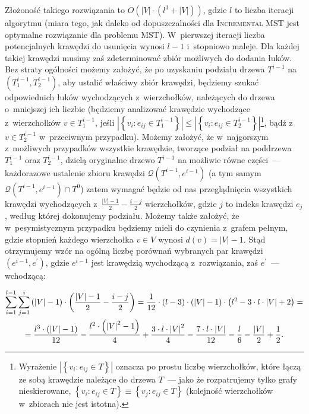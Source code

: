 Złożoność takiego rozwiązania to $O \left( \left| V \right| \cdot \left(l^{3} + \left| V \right| \right) \right)$, gdzie $l$ to liczba iteracji algorytmu (miara tego, jak daleko od dopuszczalności dla \textsc{Incremental MST} jest optymalne rozwiązanie dla problemu \textsc{MST}).
W~pierwszej iteracji liczba potencjalnych krawędzi do usunięcia wynosi $l - 1$ i~stopniowo maleje.
Dla każdej takiej krawędzi musimy zaś zdeterminować zbiór możliwych do dodania łuków.
Bez straty ogólności możemy założyć, że po uzyskaniu podziału drzewa $T^{i-1}$ na $\left( T^{i-1}_{1}, T^{i-1}_{2} \right)$, aby ustalić właściwy zbiór krawędzi, będziemy szukać odpowiednich łuków wychodzących z~wierzchołków, należących do drzewa o~mniejszej ich liczbie (będziemy analizować krawędzie wychodzące z~wierzchołków $v \in T^{i-1}_{1}$, jeśli $\left| \left\{ v_{i} : e_{ij} \in T^{i-1}_{1} \right\} \right| \leqslant \left| \left\{ v_{i} : e_{ij} \in T^{i-1}_{2} \right\} \right|$\footnote{
	Wyrażenie $\left| \left\{ v_{i} : e_{ij} \in T \right\} \right|$ oznacza po prostu liczbę wierzchołków, które łączą ze sobą krawędzie należące do drzewa $T$~--- jako że rozpatrujemy tylko grafy nieskierowane, $\left\{ v_{i} : e_{ij} \in T \right\} \equiv \left\{ v_{j} : e_{ij} \in T \right\}$ (kolejność wierzchołków w~zbiorach nie jest istotna).
}, bądź z~$v \in T^{i-1}_{2}$ w~przeciwnym przypadku).
Możemy założyć, że w~najgorszym z~możliwych przypadków wszystkie krawędzie, tworzące podział na poddrzewa $T^{i-1}_{1}$ oraz $T^{i-1}_{2}$, dzielą oryginalne drzewo $T^{i-1}$ na możliwie równe części~--- każdorazowe ustalenie zbioru krawędzi $\mathcal{Q} \left( T^{i-1}, e^{i-1} \right)$ (a tym samym $\mathcal{Q} \left( T^{i-1}, e^{i-1} \right) \cap T^{0}$) zatem wymagać będzie od nas przeglądnięcia wszystkich krawędzi wychodzących z~$\frac{\left| V \right| - 1}{2} - \frac{i - j}{2}$ wierzchołków, gdzie $j$ to indeks krawędzi $e_{j}$, według której dokonujemy podziału.
Możemy także założyć, że w~pesymistycznym przypadku będziemy mieli do czynienia z~grafem pełnym, gdzie stopnień każdego wierzchołka $v \in V$ wynosi $d \left( v \right) = \left| V \right| - 1$.
Stąd otrzymujemy wzór na ogólną liczbę porównań wybranych par krawędzi $\left( e^{i-1}, e^{\prime} \right)$, gdzie $e^{i-1}$ jest krawędzią wychodzącą z~rozwiązania, zaś $e^{\prime}$~--- wchodzącą:

\begin{gather*}
	\sum_{\mathclap{i=1}}^{\mathclap{l-1}} \sum_{\mathclap{j=1}}^{\mathclap{i}} \left( \left| V \right| - 1 \right) \cdot \left( \frac{\left| V \right| - 1}{2} - \frac{i - j}{2} \right) = \frac{1}{12} \cdot \left( l - 3 \right) \cdot \left( \left| V \right| - 1 \right) \cdot \left( l^{2} - 3 \cdot l \cdot \left| V \right| + 2 \right) = \\ 
	= \frac{l^{3} \cdot \left( \left| V \right| - 1 \right)}{12} - \frac{l^{2} \cdot \left( \left| V \right|^{2} - 1 \right)}{4} + \frac{3 \cdot l \cdot \left| V \right|^{2}}{4} - \frac{7 \cdot l \cdot \left| V \right|}{12} - \frac{l}{6} - \frac{\left| V \right|}{2} + \frac{1}{2}\text{.}
\end{gather*}

